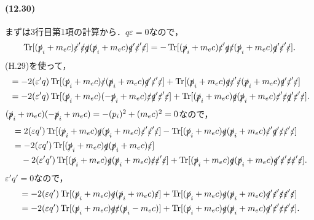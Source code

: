 \paragraph{(12.30)}
まずは3行目第1項の計算から．$q\varepsilon=0$なので，
\[\operatorname{Tr} [(\slashed{p}_i+m_ec)\slashed{\varepsilon}'\slashed{\varepsilon}\slashed{q}(\slashed{p}_i+m_ec)\slashed{q}'\slashed{\varepsilon}'\slashed{\varepsilon}] = -\operatorname{Tr} [(\slashed{p}_i+m_ec)\slashed{\varepsilon}'\slashed{q}\slashed{\varepsilon}(\slashed{p}_i+m_ec)\slashed{q}'\slashed{\varepsilon}'\slashed{\varepsilon}].\]
(H.29)を使って，
\begin{align*}
  & = -2(\varepsilon'q)\operatorname{Tr} [(\slashed{p}_i+m_ec)\slashed{\varepsilon}(\slashed{p}_i+m_ec)\slashed{q}'\slashed{\varepsilon}'\slashed{\varepsilon}]
  + \operatorname{Tr} [(\slashed{p}_i+m_ec)\slashed{q}\slashed{\varepsilon}'\slashed{\varepsilon}(\slashed{p}_i+m_ec)\slashed{q}'\slashed{\varepsilon}'\slashed{\varepsilon}]\\
  & = -2(\varepsilon'q)\operatorname{Tr} [(\slashed{p}_i+m_ec)(-\slashed{p}_i+m_ec)\slashed{\varepsilon}\slashed{q}'\slashed{\varepsilon}'\slashed{\varepsilon}]
  + \operatorname{Tr} [(\slashed{p}_i+m_ec)\slashed{q}(\slashed{p}_i+m_ec)\slashed{\varepsilon}'\slashed{\varepsilon}\slashed{q}'\slashed{\varepsilon}'\slashed{\varepsilon}].
\end{align*}
$(\slashed{p}_i+m_ec)(-\slashed{p}_i+m_ec)=-(p_i)^2+(m_ec)^2=0$なので，
\begin{align*}
  & = 2(\varepsilon q')\operatorname{Tr} [(\slashed{p}_i+m_ec)\slashed{q}(\slashed{p}_i+m_ec)\slashed{\varepsilon}'\slashed{\varepsilon}'\slashed{\varepsilon}]
  - \operatorname{Tr} [(\slashed{p}_i+m_ec)\slashed{q}(\slashed{p}_i+m_ec)\slashed{\varepsilon}'\slashed{q}'\slashed{\varepsilon}\slashed{\varepsilon}'\slashed{\varepsilon}]\\
  & = -2(\varepsilon q')\operatorname{Tr} [(\slashed{p}_i+m_ec)\slashed{q}(\slashed{p}_i+m_ec)\slashed{\varepsilon}]\\
  & \quad - 2(\varepsilon'q')\operatorname{Tr} [(\slashed{p}_i+m_ec)\slashed{q}(\slashed{p}_i+m_ec)\slashed{\varepsilon}\slashed{\varepsilon}'\slashed{\varepsilon}] + \operatorname{Tr} [(\slashed{p}_i+m_ec)\slashed{q}(\slashed{p}_i+m_ec)\slashed{q}'\slashed{\varepsilon}'\slashed{\varepsilon}\slashed{\varepsilon}'\slashed{\varepsilon}].
\end{align*}
$\varepsilon'q'=0$なので，
\begin{align*}
  & = -2(\varepsilon q')\operatorname{Tr} [(\slashed{p}_i+m_ec)\slashed{q}(\slashed{p}_i+m_ec)\slashed{\varepsilon}] + \operatorname{Tr} [(\slashed{p}_i+m_ec)\slashed{q}(\slashed{p}_i+m_ec)\slashed{q}'\slashed{\varepsilon}'\slashed{\varepsilon}\slashed{\varepsilon}'\slashed{\varepsilon}]\\
  & = -2(\varepsilon q')\operatorname{Tr} [(\slashed{p}_i+m_ec)\slashed{q}\slashed{\varepsilon}(\slashed{p}_i-m_ec)] + \operatorname{Tr} [(\slashed{p}_i+m_ec)\slashed{q}(\slashed{p}_i+m_ec)\slashed{q}'\slashed{\varepsilon}'\slashed{\varepsilon}\slashed{\varepsilon}'\slashed{\varepsilon}].
\end{align*}

